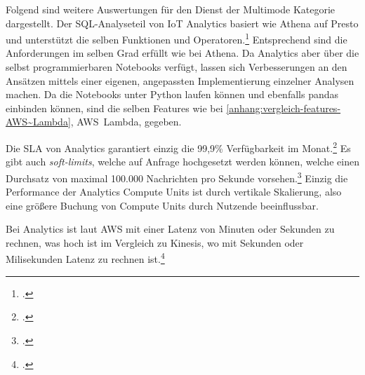\label{anhang:vergleich-multimode}
Folgend sind weitere Auswertungen für den Dienst der Multimode Kategorie dargestellt.
Der \ac{SQL}-Analyseteil von IoT Analytics basiert wie Athena auf Presto und unterstützt die selben Funktionen und Operatoren.\footcite[Vgl.][]{AmazonWebServicesInc..o.J.au} Entsprechend sind die Anforderungen im selben Grad erfüllt wie bei Athena. Da \AWSIOT{} Analytics aber über die selbst programmierbaren Notebooks verfügt, lassen sich Verbesserungen an den Ansätzen mittels einer eigenen, angepassten Implementierung einzelner Analysen machen.
Da die Notebooks unter Python laufen können und ebenfalls pandas einbinden können, sind die selben Features wie bei \ref{anhang:vergleich-features-AWS~Lambda}, AWS~Lambda, gegeben.

Die \ac{SLA} von \AWSIOT{} Analytics garantiert einzig die 99,9\% Verfügbarkeit im Monat.\footcite[Vgl.][]{AmazonWebServicesInc..2019f} Es gibt auch \textit{soft-limits}, welche auf Anfrage hochgesetzt werden können, welche einen Durchsatz von maximal 100.000 Nachrichten pro Sekunde vorsehen.\footcite[Vgl][]{AmazonWebServicesInc..o.J.av} Einzig die Performance der Analytics Compute Units ist durch vertikale Skalierung, also eine größere Buchung von Compute Units durch Nutzende beeinflussbar.

Bei \AWSIOT{} Analytics ist laut \ac{AWS} mit einer Latenz von Minuten oder Sekunden zu rechnen, was hoch ist im Vergleich zu Kinesis, wo mit Sekunden oder Milisekunden Latenz zu rechnen ist.\footcite[Vgl.][]{AmazonWebServicesInc..o.J.ax}